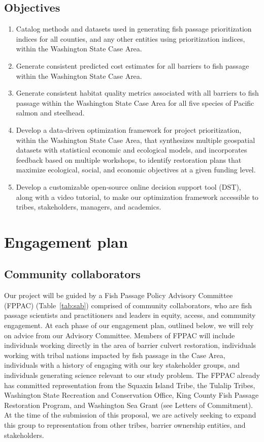 \documentclass[12pt]{elsarticle}
\begin{document}
\subsection*{Objectives}
\begin{enumerate}
\item Catalog methods and datasets used in generating fish passage prioritization indices for all counties, and any other entities using prioritization indices, within the Washington State Case Area. 
\item Generate consistent predicted cost estimates for all barriers to fish passage within the Washington State Case Area. 
\item Generate consistent habitat quality metrics associated with all barriers to fish passage within the Washington State Case Area for all five species of Pacific salmon and steelhead.
\item Develop a data-driven optimization framework for project prioritization, within the Washington State Case Area, that synthesizes multiple geospatial datasets with statistical economic and ecological models, and incorporates feedback based on multiple workshops, to identify restoration plans that maximize ecological, social, and economic objectives at a given funding level.
\item Develop a customizable open-source online decision support tool (DST), along with a video tutorial, to make our optimization framework accessible to tribes, stakeholders, managers, and academics. 
\end{enumerate}

%
\section{Engagement plan \label{sec:engage}}

\subsection*{Community collaborators} 

Our project will be guided by a Fish Passage Policy Advisory Committee (FPPAC) (Table~\ref{tab:sab}) comprised of community collaborators, who are fish passage scientists and practitioners and leaders in equity, access, and community engagement. At each phase of our engagement plan, outlined below, we will rely on advice from our Advisory Committee. Members of FPPAC will include individuals working directly in the area of barrier culvert restoration, individuals working with tribal nations impacted by fish passage in the Case Area, individuals with a history of engaging with our key stakeholder groups, and individuals generating science relevant to our study problem. The FPPAC already has committed representation from the Squaxin Island Tribe, the Tulalip Tribes, Washington State Recreation and Conservation Office, King County Fish Passage Restoration Program, and Washington Sea Grant (see Letters of Commitment). At the time of the submission of this proposal, we are actively seeking to expand this group to representation from other tribes, barrier ownership entities, and stakeholders. 
\end{document}
